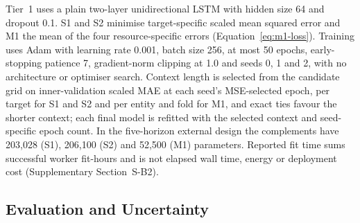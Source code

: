 \documentclass[5p,twocolumn]{elsarticle}
\begin{document}
Tier~1 uses a plain two-layer unidirectional LSTM \citep{Hochreiter1997LSTM}
with hidden size 64 and dropout 0.1. S1 and S2 minimise target-specific scaled
mean squared error and M1 the mean of the four resource-specific errors
(Equation~\ref{eq:m1-loss}). Training uses Adam with learning rate 0.001,
batch size 256, at most 50 epochs, early-stopping patience 7, gradient-norm
clipping at 1.0 and seeds 0, 1 and 2, with no architecture or optimiser
search. Context length is selected from the candidate grid on
inner-validation scaled MAE at each seed's MSE-selected epoch, per target for
S1 and S2 and per entity and fold for M1, and exact ties favour the shorter
context; each final model is refitted with the selected context and
seed-specific epoch count. In the five-horizon external design the
complements have 203,028 (S1), 206,100 (S2) and 52,500 (M1) parameters.
Reported fit time sums successful worker fit-hours and is not elapsed wall
time, energy or deployment cost (Supplementary Section~S-B2).

\subsection{Evaluation and Uncertainty}
\label{sec:evaluation}
\end{document}

